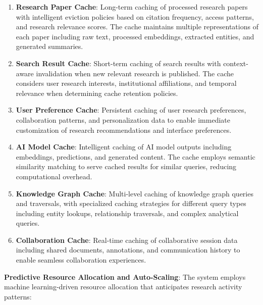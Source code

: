 \documentclass[10pt,twocolumn]{article}
\begin{document}
\begin{enumerate}
    \item \textbf{Research Paper Cache}: Long-term caching of processed research papers with intelligent eviction policies based on citation frequency, access patterns, and research relevance scores. The cache maintains multiple representations of each paper including raw text, processed embeddings, extracted entities, and generated summaries.
    
    \item \textbf{Search Result Cache}: Short-term caching of search results with context-aware invalidation when new relevant research is published. The cache considers user research interests, institutional affiliations, and temporal relevance when determining cache retention policies.
    
    \item \textbf{User Preference Cache}: Persistent caching of user research preferences, collaboration patterns, and personalization data to enable immediate customization of research recommendations and interface preferences.
    
    \item \textbf{AI Model Cache}: Intelligent caching of AI model outputs including embeddings, predictions, and generated content. The cache employs semantic similarity matching to serve cached results for similar queries, reducing computational overhead.
    
    \item \textbf{Knowledge Graph Cache}: Multi-level caching of knowledge graph queries and traversals, with specialized caching strategies for different query types including entity lookups, relationship traversals, and complex analytical queries.
    
    \item \textbf{Collaboration Cache}: Real-time caching of collaborative session data including shared documents, annotations, and communication history to enable seamless collaboration experiences.
\end{enumerate}

\textbf{Predictive Resource Allocation and Auto-Scaling}: The system employs machine learning-driven resource allocation that anticipates research activity patterns:
\end{document}
